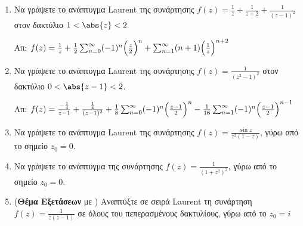 \begin{enumerate}
\item Να γράψετε το ανάπτυγμα Laurent της συνάρτησης $f(z)=\frac{1}{z}+\frac{1}{z+2}+\frac{1}{(z-1)^2}$ στον δακτύλιο $1<\abs{z}<2$

\hfill Απ: $f(z)=\frac{1}{z}+\frac{1}{2}\sum_{n=0}^{\infty}(-1)^n\Bigl(\frac{z}{2}\Bigr)^n+\sum_{n=1}^{\infty}(n+1)\Bigl(\frac{1}{z}\Bigr)^{n+2}$

\item Να γράψετε το ανάπτυγμα Laurent της συνάρτησης $f(z)=\frac{1}{(z^2-1)^2}$ στον δακτύλιο $0<\abs{z-1}<2$.

\hfill Απ: $f(z)=\frac{-\frac{1}{4}}{z-1}+\frac{\frac{1}{4}}{(z-1)^2}+\frac{1}{8}\sum_{n=0}^{\infty}(-1)^n\Bigl(\frac{z-1}{2}\Bigr)^n-\frac{1}{16}\sum_{n=1}^{\infty}(-1)^n\Bigl(\frac{z-1}{2}\Bigr)^{n-1}$

\item Να γράψετε το ανάπτυγμα Laurent της συνάρτησης $f(z)=\frac{\sin z}{z^2(1-z)}$, γύρω από το σημείο $z_0=0$.

\item Να γράψετε το ανάπτυγμα  της συνάρτησης $f(z)=\frac{1}{(1+z^2)^2}$, γύρω από το σημείο $z_0=0$.

\item (\textbf{Θέμα Εξετάσεων} με \unboldmath) Αναπτύξτε σε σειρά Laurent τη συνάρτηση $f(z)=\frac{1}{z(z-1)}$ σε όλους του πεπερασμένους δακτυλίους, γύρω από το $z_0=i$

\end{enumerate}





